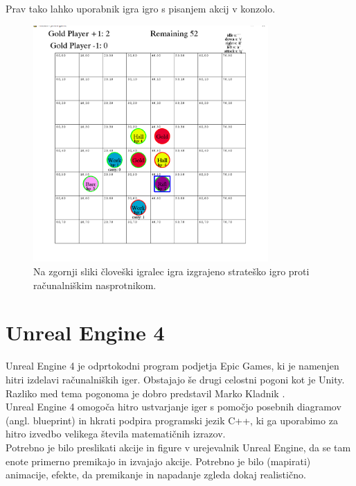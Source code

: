 \documentclass[a4paper, 12pt]{book}
\begin{document}
Prav tako lahko uporabnik igra igro s pisanjem akcij v konzolo.

\begin{figure}[h]
	\begin{center}
		\includegraphics[width=0.8\textwidth]{visualization_pygame.pdf}
	\end{center}
	\caption{Na zgornji sliki človeški igralec igra izgrajeno strateško igro proti računalniškim nasprotnikom.}
	\label{visualization_pygame}
\end{figure}

\section{Unreal Engine 4}

Unreal Engine 4 je odprtokodni program podjetja Epic Games, ki je namenjen hitri izdelavi računalniških iger. Obstajajo še drugi celostni pogoni kot je Unity.\\
Razliko med tema pogonoma je dobro predstavil Marko Kladnik \cite{diploma2}.\\
Unreal Engine 4 omogoča hitro ustvarjanje iger s pomočjo posebnih diagramov (angl. blueprint) in hkrati podpira programski jezik C++, ki ga uporabimo za hitro izvedbo velikega števila matematičnih izrazov.\\

Potrebno je bilo preslikati akcije in figure v urejevalnik Unreal Engine, da se tam enote primerno premikajo in izvajajo akcije.
Potrebno je bilo (mapirati) animacije, efekte, da premikanje in napadanje zgleda dokaj realistično.
\end{document}
